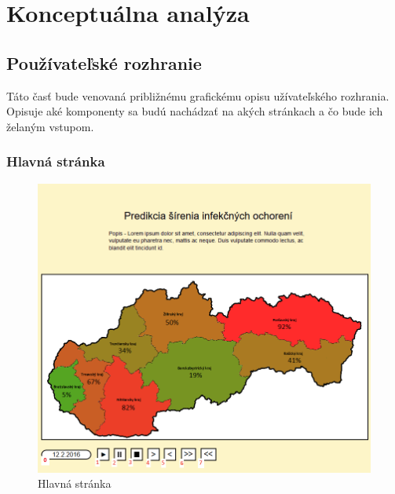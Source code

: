 \documentclass[12pt,a4paper]{report}
\begin{document}
\renewcommand{\chaptername}{}	
\chapter[Konceptuálna analýza]{\rmfamily\bfseries
	Konceptuálna analýza}

\section[Používateľské rozhranie]{\rmfamily\bfseries
	Používateľské rozhranie}
Táto  časť  bude  venovaná približnému  grafickému  opisu užívateľského  rozhrania. Opisuje aké komponenty sa budú nachádzať na akých stránkach a čo bude ich želaným vstupom.

\subsection[Hlavná stránka]{\rmfamily\bfseries
	Hlavná stránka}

\begin{figure}[htb]
	\centering
	\includegraphics[scale=0.55]{hl_stranka}
	\caption{Hlavná stránka}
	\label{fig:Hlavná stránka}
\end{figure}
\end{document}
